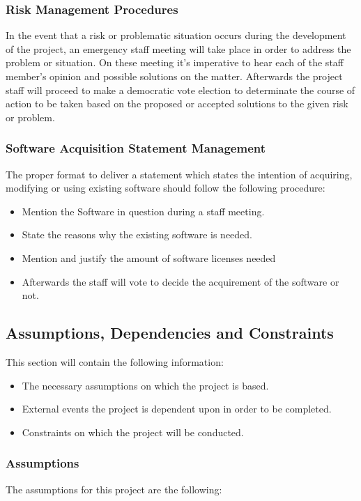 \documentclass[12pt]{article}
\begin{document}
\subsubsection{Risk Management Procedures}
In the event that a risk or problematic situation occurs during the development of the project, an emergency staff meeting will take place in order to address the problem or situation. On these meeting it’s imperative to hear each of the staff member’s opinion and possible solutions on the matter. Afterwards the project staff will proceed to make a democratic vote election to determinate the course of action to be taken based on the proposed or accepted solutions to the given risk or problem.

\subsubsection{Software Acquisition Statement Management}
The proper format to deliver a statement which states the intention of acquiring, modifying or using existing software should follow the following procedure:

\begin{itemize}
  \item	Mention the Software in question during a staff meeting.
  \item State the reasons why the existing software is needed.
  \item Mention and justify the amount of software licenses needed
  \item Afterwards the staff will vote to decide the acquirement of the software or not.
\end{itemize}

\subsection{Assumptions, Dependencies and Constraints}
This section will contain the following information:

 \begin{itemize}
   \item The necessary assumptions on which the project is based.
   \item External events the project is dependent upon in order to be completed.
   \item Constraints on which the project will be conducted.
 \end{itemize}

\subsubsection{Assumptions}
The assumptions for this project are the following:
\end{document}
